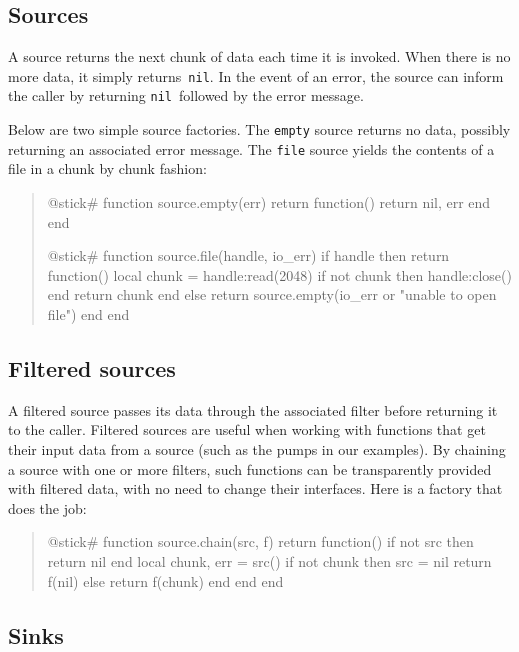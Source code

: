 \documentclass[10pt]{article}
\newcommand{\nil}{\texttt{nil}}
\begin{document}
\subsection{Sources}

A source returns the next chunk of data each time it is
invoked. When there is no more data, it simply returns~\nil.  
In the event of an error, the source can inform the
caller by returning \nil\ followed by the error message.

Below are two simple source factories. The \texttt{empty} source
returns no data, possibly returning an associated error
message. The \texttt{file} source yields the contents of a file 
in a chunk by chunk fashion:
\begin{quote}
\begin{lua}
@stick#
function source.empty(err)
  return function()
    return nil, err
  end
end
%

@stick#
function source.file(handle, io_err)
  if handle then 
    return function()
      local chunk = handle:read(2048)
      if not chunk then handle:close() end
      return chunk
    end
  else return source.empty(io_err or "unable to open file") end
end
%
\end{lua}
\end{quote}

\subsection{Filtered sources}

A filtered source passes its data through the
associated filter before returning it to the caller. 
Filtered sources are useful when working with
functions that get their input data from a source (such as
the pumps in our examples). By chaining a source with one or
more filters, such functions can be transparently provided
with filtered data, with no need to change their interfaces. 
Here is a factory that does the job:
\begin{quote}
\begin{lua}
@stick#
function source.chain(src, f)
  return function()
    if not src then 
      return nil 
    end
    local chunk, err = src()
    if not chunk then 
      src = nil
      return f(nil)
    else 
      return f(chunk) 
    end
  end
end
%
\end{lua}
\end{quote}

\subsection{Sinks}
\end{document}
